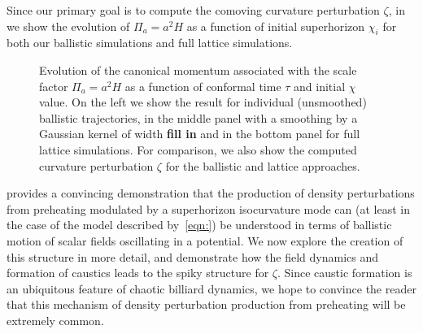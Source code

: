 Since our primary goal is to compute the comoving curvature perturbation $\zeta$, in~ we show the evolution of $\Pi_a=a^2H$ as a function of initial superhorizon $\chi_i$ for both our ballistic simulations and full lattice simulations.
\begin{figure}\label{fig:pia_waves}
  \caption{Evolution of the canonical momentum associated with the scale factor $\Pi_a = a^2H$ as a function of conformal time $\tau$ and initial $\chi$ value.  On the left we show the result for individual (unsmoothed) ballistic trajectories, in the middle panel with a smoothing by a Gaussian kernel of width {\bf fill in} and in the bottom panel for full lattice simulations.  For comparison, we also show the computed curvature perturbation $\zeta$ for the ballistic and lattice approaches.}
\end{figure}
 provides a convincing demonstration that the production of density perturbations from preheating modulated by a superhorizon isocurvature mode can (at least in the case of the model described by~\eqref{eqn:}) be understood in terms of ballistic motion of scalar fields oscillating in a potential.
We now explore the creation of this structure in more detail, and demonstrate how the field dynamics and formation of caustics leads to the spiky structure for $\zeta$.
Since caustic formation is an ubiquitous feature of chaotic billiard dynamics, we hope to convince the reader that this mechanism of density perturbation production from preheating will be extremely common.

